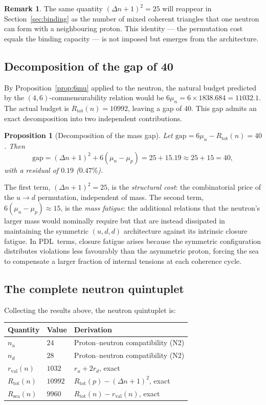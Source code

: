 \documentclass[11pt,a4paper]{article}
\newtheorem{proposition}[theorem]{Proposition}
\theoremstyle{definition}
\newtheorem{remark}[theorem]{Remark}
\newcommand{\PDL}{\textnormal{PDL}}
\newcommand{\Rsea}{R_{\mathrm{sea}}}
\newcommand{\Rtot}{R_{\mathrm{tot}}}
\newcommand{\rval}{r_{\mathrm{val}}}
\begin{document}
\begin{remark}
The same quantity $(\Delta n + 1)^2 = 25$ will reappear in Section~\ref{sec:binding} as the number of mixed coherent triangles that one neutron can form with a neighbouring proton. This identity --- the permutation cost equals the binding capacity --- is not imposed but emerges from the architecture.
\end{remark}

\subsection{Decomposition of the gap of 40}
\label{subsec:gap40}

By Proposition~\ref{prop:6mu} applied to the neutron, the natural budget predicted by the $(4,6)$-commensurability relation would be $6\mu_n = 6 \times 1838.684 = 11032.1$. The actual budget is $\Rtot(n) = 10992$, leaving a gap of $40$. This gap admits an exact decomposition into two independent contributions.

\begin{proposition}[Decomposition of the mass gap]
\label{prop:gap40}
Let $\mathrm{gap} = 6\mu_n - \Rtot(n) = 40$. Then
\[
\mathrm{gap} = (\Delta n + 1)^2 + 6(\mu_n - \mu_p) = 25 + 15.19 \approx 25 + 15 = 40,
\]
with a residual of $0.19$ ($0.47\%$).
\end{proposition}

The first term, $(\Delta n + 1)^2 = 25$, is the \emph{structural cost}: the combinatorial price of the $u \to d$ permutation, independent of mass. The second term, $6(\mu_n - \mu_p) \approx 15$, is the \emph{mass fatigue}: the additional relations that the neutron's larger mass would nominally require but that are instead dissipated in maintaining the symmetric $(u,d,d)$ architecture against its intrinsic closure fatigue. In \PDL\ terms, closure fatigue arises because the symmetric configuration distributes violations less favourably than the asymmetric proton, forcing the sea to compensate a larger fraction of internal tensions at each coherence cycle.\cite{PDL_Main_2026}

\subsection{The complete neutron quintuplet}
\label{subsec:neutron_quintuplet}

Collecting the results above, the neutron quintuplet is:

\begin{center}
\begin{tabular}{lll}
\hline
Quantity & Value & Derivation \\
\hline
$n_u$ & $24$ & Proton--neutron compatibility (N2) \\
$n_d$ & $28$ & Proton--neutron compatibility (N2) \\
$\rval(n)$ & $1032$ & $r_u + 2r_d$, exact \\
$\Rtot(n)$ & $10992$ & $\Rtot(p) - (\Delta n+1)^2$, exact \\
$\Rsea(n)$ & $9960$ & $\Rtot(n) - \rval(n)$, exact \\
\hline
\end{tabular}
\end{center}
\end{document}
